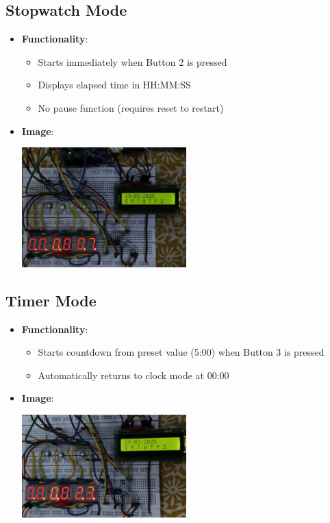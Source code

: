 \documentclass{article}
\begin{document}
\subsection{Stopwatch Mode}
\begin{itemize}
    \item \textbf{Functionality}:
    \begin{itemize}
        \item Starts immediately when Button 2 is pressed
        \item Displays elapsed time in HH:MM:SS
        \item No pause function (requires reset to restart)
    \end{itemize}
    \item \textbf{Image}:
    \begin{center}
        \includegraphics[width=0.5\textwidth]{figs/2.jpg}
    \end{center}
\end{itemize}

\subsection{Timer Mode}
\begin{itemize}
    \item \textbf{Functionality}:
    \begin{itemize}
        \item Starts countdown from preset value (5:00) when Button 3 is pressed
        \item Automatically returns to clock mode at 00:00
    \end{itemize}
    \item \textbf{Image}:
    \begin{center}
        \includegraphics[width=0.5\textwidth]{figs/3.jpg}
    \end{center}
\end{itemize}
\end{document}
